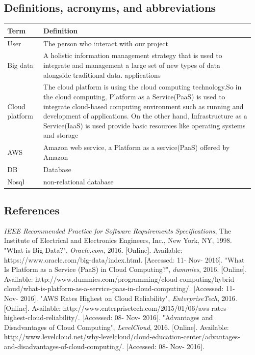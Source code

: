 \documentclass[10pt,draftclsnofoot,onecolumn,journal,compsoc]{IEEEtran}
\begin{document}
        \subsection{Definitions, acronyms, and abbreviations} 
        \begin{tabu} to 
        \hline
        \textbf{Term} & \textbf{Definition}\\
        \hline
        User & The person who interact with our project \\
        \hline
        Big data & A holistic information management strategy that is used to integrate and management a large set of new types of data alongside traditional data. applications\cite{big data}\\
        \hline
        Cloud platform & The cloud platform is using the cloud computing technology.So in the cloud computing, Platform as a Service(PaaS) is used to integrate cloud-based computing environment such as running and development of applications. On the other hand, Infrastructure as a Service(IaaS) is used provide basic resources like operating systems and storage\cite{cplatform}\\
        \hline
        AWS & Amazon web service, a Platform as a service(PaaS) offered by Amazon \\
        \hline
        DB & Database\\
        \hline
        Nosql & non-relational database\\
        \hline
        \end{tabu}
        
        \subsection{References}
        
        \begin{thebibliography}{9}
    
        \textit{IEEE Recommended Practice for Software Requirements Specifications}, The Institute of Electrical and Electronics Engineers, Inc., New York, NY, 1998.
        "What is Big Data?", \textit{Oracle.com}, 2016. [Online]. Available: https://www.oracle.com/big-data/index.html. [Accessed: 11- Nov- 2016].
        "What Is Platform as a Service (PaaS) in Cloud Computing?", \textit{dummies}, 2016. [Online]. Available: http://www.dummies.com/programming/cloud-computing/hybrid-cloud/what-is-platform-as-a-service-paas-in-cloud-computing/. [Accessed: 11- Nov- 2016].
        "AWS Rates Highest on Cloud Reliability", \textit{EnterpriseTech}, 2016. [Online]. Available: http://www.enterprisetech.com/2015/01/06/aws-rates-highest-cloud-reliability/. [Accessed: 08- Nov- 2016].
        "Advantages and Disadvantages of Cloud Computing", \textit{LevelCloud}, 2016. [Online]. Available: http://www.levelcloud.net/why-levelcloud/cloud-education-center/advantages-and-disadvantages-of-cloud-computing/. [Accessed: 08- Nov- 2016].
        
        \end{thebibliography}
\end{document}

